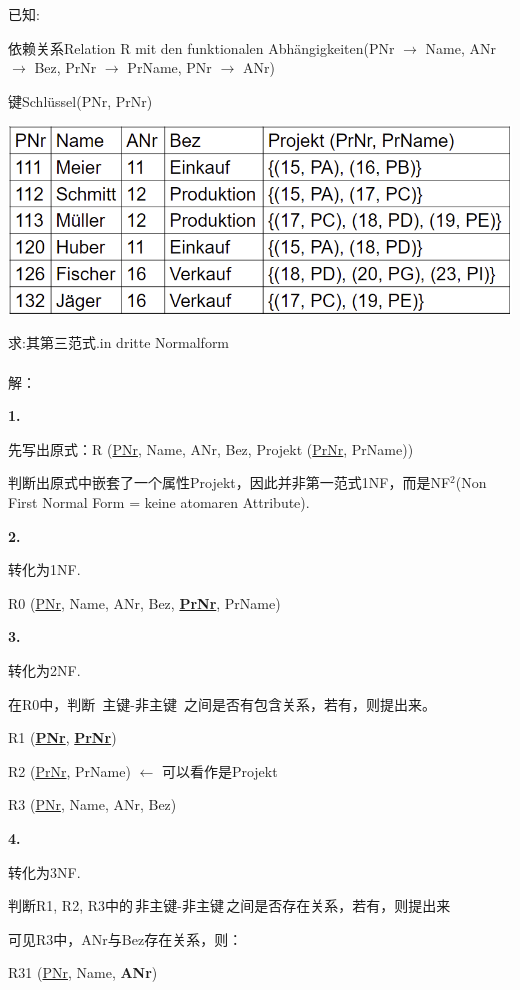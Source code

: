 \documentclass[fleqn]{article}
\begin{document}
\noindent 已知:

依赖关系Relation R mit den funktionalen Abhängigkeiten(PNr $\rightarrow$ Name, ANr $\rightarrow$ Bez, PrNr $\rightarrow$ PrName,   PNr $\rightarrow$ ANr)

键Schlüssel(PNr, PrNr)

\begin{center}
    \includegraphics[scale=0.5]{22.png}
\end{center}

\noindent 求:其第三范式.in dritte Normalform
\\
\\
解：

\textbf{1.} 

先写出原式：R (\underline{PNr}, Name, ANr, Bez, Projekt (\underline{PrNr}, PrName))

判断出原式中嵌套了一个属性Projekt，因此并非第一范式1NF，而是NF$^2$(Non First Normal Form = keine atomaren Attribute).

\textbf{2.}

转化为1NF.

R0 (\underline{PNr}, Name, ANr, Bez, \underline{\textbf{PrNr}}, PrName)

\textbf{3.}

转化为2NF.

在R0中，判断\, 主键-非主键\, 之间是否有包含关系，若有，则提出来。

R1 (\underline{\textbf{PNr}}, \underline{\textbf{PrNr}})

R2 (\underline{PrNr}, PrName) $\leftarrow$ 可以看作是Projekt

R3 (\underline{PNr}, Name, ANr, Bez)

\textbf{4.}

转化为3NF.

判断R1, R2, R3中的\,非主键-非主键\,之间是否存在关系，若有，则提出来

可见R3中，ANr与Bez存在关系，则：

R31 (\underline{PNr}, Name, \textbf{ANr})
\end{document}
